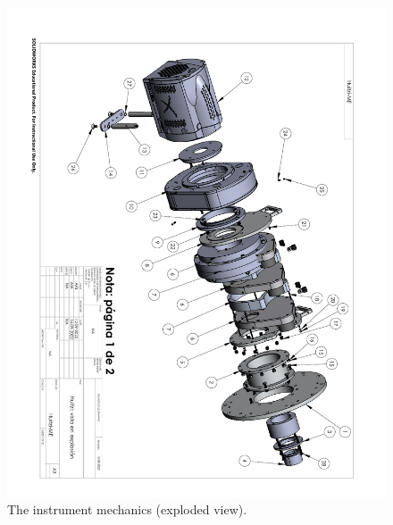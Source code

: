 \begin{figure}
\begin{center}
\includegraphics[angle=180,width=0.9\linewidth]{figures/huitzi-f20-3d-exploded.pdf}
\end{center}
\caption{The instrument mechanics (exploded view).}
\label{figure:huitzi-f20-3d-exploded}
\end{figure}

